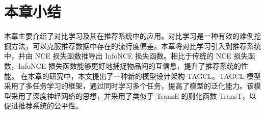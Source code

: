 \section{本章小结}
本章主要介绍了对比学习及其在推荐系统中的应用。对比学习是一种有效的难例挖掘方法，可以克服推荐数据中存在的流行度偏差。本章将对比学习引入到推荐系统中，并由 NCE 损失函数推导出 InfoNCE 损失函数。相比于传统的 NCE 损失函数，InfoNCE 损失函数能够更好地捕捉物品间的互信息，提升了推荐系统的性能。 在本章的研究中，本文提出了一种新的模型设计架构 TAGCL。TAGCL 模型采用了多任务学习的框架，通过同时学习多个任务，提高了模型的泛化能力。该模型采用了深度神经网络的思想，并采用了类似于 TransE 的则化函数 TransT，以促进推荐系统的公平性。